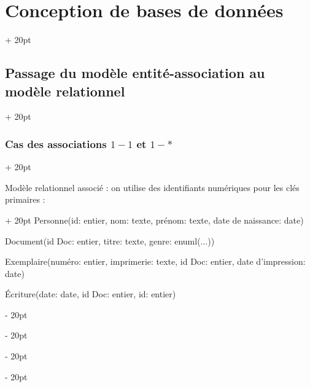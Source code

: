 \documentclass[a4paper, 12pt, twoside]{article}
\newcommand{\ind}[1][20pt]{\advance\leftskip + #1}
\newcommand{\deind}[1][20pt]{\advance\leftskip - #1}
\newenvironment{indt}[2][20pt]{#2 \par \ind[#1]}{\par \deind} %
\begin{document}
\begin{indt}{\section{Conception de bases de données}}
\begin{indt}{\subsection{Passage du modèle entité-association au modèle relationnel}}
\begin{indt}{\subsubsection{Cas des associations $1-1$ et $1-*$}}
\begin{center}
                \end{center}

                \begin{indt}{Modèle relationnel associé : on utilise des identifiants numériques pour les clés primaires :}
                    Personne(id: entier, nom: texte, prénom: texte, date de naissance: date)
                    
                    Document(id Doc: entier, titre: texte, genre: enuml(...))
                    
                    Exemplaire(numéro: entier, imprimerie: texte, id Doc: entier, date d'impression: date)
                    
                    \'Ecriture(date: date, id Doc: entier, id: entier)
                \end{indt}
            \end{indt}
        \end{indt}
    \end{indt}
    
    
    
\end{document}

